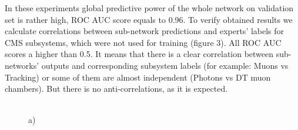 \documentclass[a4paper]{jpconf}
\begin{document}
In these experiments global predictive power of the whole network on validation set is rather high, ROC AUC score equals to 0.96.
To verify obtained results we calculate correlations between sub-network predictions and experts' labels for CMS subsystems, which were not used for training (figure 3). All ROC AUC scores a higher than 0.5. It means that there is a clear correlation between sub-networks’ outputs and corresponding subsystem labels (for example: Muons vs Tracking) or some of them are almost independent (Photons vs DT muon chambers). But there is no anti-correlations, as it is expected. 

\begin{figure}[H]
\begin{minipage}[h!]{0.47\linewidth}
 \\a) 
\end{minipage}
\hfill
\begin{minipage}[h!]{0.47\linewidth}

\end{minipage}
\end{figure}
\end{document}
